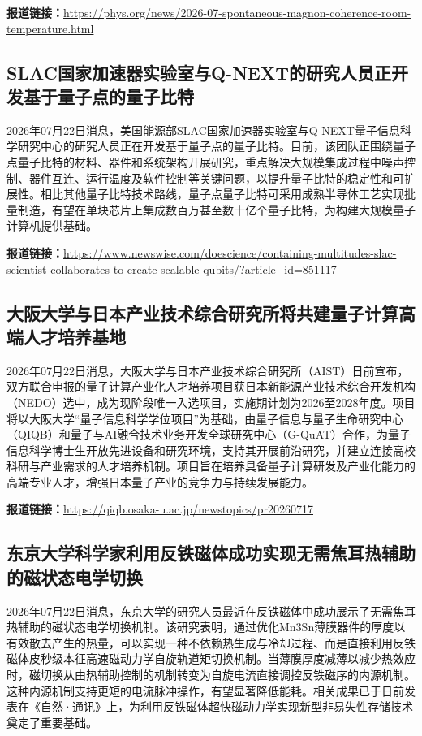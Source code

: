 \documentclass[12pt,a4paper]{ctexart}
\begin{document}
\noindent\textbf{报道链接：}\url{https://phys.org/news/2026-07-spontaneous-magnon-coherence-room-temperature.html}

\subsection{ SLAC国家加速器实验室与Q-NEXT的研究人员正开发基于量子点的量子比特 }

2026年07月22日消息，美国能源部SLAC国家加速器实验室与Q-NEXT量子信息科学研究中心的研究人员正在开发基于量子点的量子比特。目前，该团队正围绕量子点量子比特的材料、器件和系统架构开展研究，重点解决大规模集成过程中噪声控制、器件互连、运行温度及软件控制等关键问题，以提升量子比特的稳定性和可扩展性。相比其他量子比特技术路线，量子点量子比特可采用成熟半导体工艺实现批量制造，有望在单块芯片上集成数百万甚至数十亿个量子比特，为构建大规模量子计算机提供基础。

\noindent\textbf{报道链接：}\url{https://www.newswise.com/doescience/containing-multitudes-slac-scientist-collaborates-to-create-scalable-qubits/?article\_id=851117}

\subsection{ 大阪大学与日本产业技术综合研究所将共建量子计算高端人才培养基地 }

2026年07月22日消息，大阪大学与日本产业技术综合研究所（AIST）日前宣布，双方联合申报的量子计算产业化人才培养项目获日本新能源产业技术综合开发机构（NEDO）选中，成为现阶段唯一入选项目，实施期计划为2026至2028年度。项目将以大阪大学“量子信息科学学位项目”为基础，由量子信息与量子生命研究中心（QIQB）和量子与AI融合技术业务开发全球研究中心（G-QuAT）合作，为量子信息科学博士生开放先进设备和研究环境，支持其开展前沿研究，并建立连接高校科研与产业需求的人才培养机制。项目旨在培养具备量子计算研发及产业化能力的高端专业人才，增强日本量子产业的竞争力与持续发展能力。

\noindent\textbf{报道链接：}\url{https://qiqb.osaka-u.ac.jp/newstopics/pr20260717}

\subsection{ 东京大学科学家利用反铁磁体成功实现无需焦耳热辅助的磁状态电学切换 }

2026年07月22日消息，东京大学的研究人员最近在反铁磁体中成功展示了无需焦耳热辅助的磁状态电学切换机制。该研究表明，通过优化Mn3Sn薄膜器件的厚度以有效散去产生的热量，可以实现一种不依赖热生成与冷却过程、而是直接利用反铁磁体皮秒级本征高速磁动力学自旋轨道矩切换机制。当薄膜厚度减薄以减少热效应时，磁切换从由热辅助控制的机制转变为自旋电流直接调控反铁磁序的内源机制。这种内源机制支持更短的电流脉冲操作，有望显著降低能耗。相关成果已于日前发表在《自然·通讯》上，为利用反铁磁体超快磁动力学实现新型非易失性存储技术奠定了重要基础。
\end{document}
